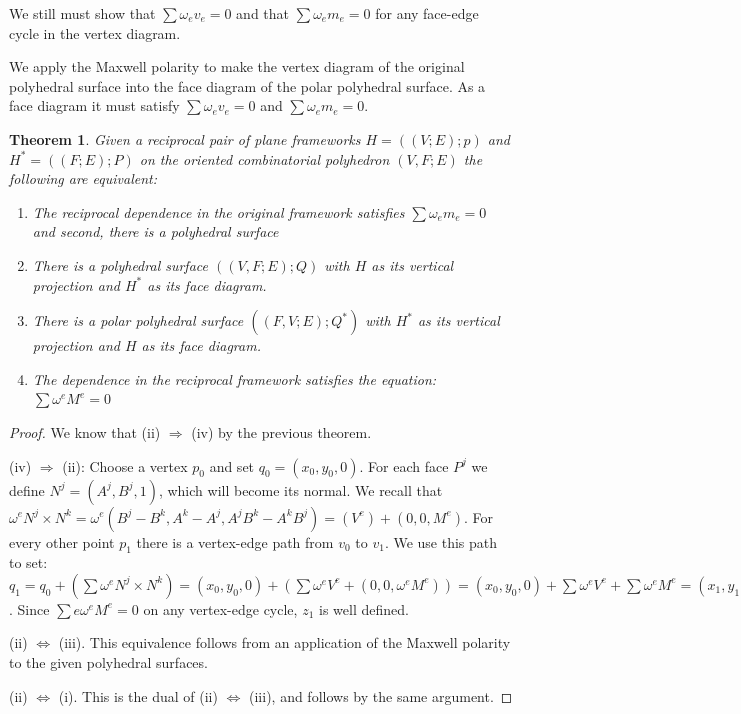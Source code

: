 \documentclass[11pt]{article}
\newtheorem{theorem}{Theorem}[section]
\theoremstyle{definition}
\begin{document}
 	We still must show that $\sum \omega_e v_e = 0$ and that $\sum \omega_em_e = 0$ for any face-edge cycle in the vertex diagram. 

	We apply the Maxwell polarity to make the vertex diagram of the original polyhedral surface into the face diagram of the polar polyhedral surface. 
	As a face diagram it must satisfy $\sum \omega_e v_e = 0$ and $\sum \omega_em_e = 0$.

	\begin{theorem} 
		Given a reciprocal pair of plane frameworks $H=((V;E);p)$ and $H^* = ((F;E);P)$ on the oriented combinatorial polyhedron $(V,F;E)$ the following are equivalent: 
 		\begin{enumerate} 
 			\item The reciprocal dependence in the original framework satisfies $\sum \omega_em_e = 0$ and second, there is a polyhedral surface 
 			\item There is a polyhedral surface $((V,F;E);Q)$ with $H$ as its vertical projection and $H^*$ as its face diagram.
			\item There is a polar polyhedral surface $((F,V;E);Q^*)$ with $H^*$ as its vertical projection and $H$ as its face diagram.
			\item The dependence in the reciprocal framework satisfies the equation: $\sum \omega^eM^e = 0$
		\end{enumerate}
	\end{theorem}
	
	\begin{proof}
		We know that (ii) $\Rightarrow$ (iv) by the previous theorem. 

		(iv) $\Rightarrow$ (ii): 
		Choose a vertex $p_0$ and set $q_0 = (x_0, y_0,0)$. 
		For each face $P^j$ we define $N^j = (A^j,B^j,1)$, which will become its normal. 
		We recall that $\omega^eN^j \times N^k = \omega^e(B^j-B^k,A^k-A^j, A^jB^k-A^kB^j) = (V^e) + (0,0,M^e)$. 
		For every other point $p_1$ there is a vertex-edge path from $v_0$ to $v_1$. 
		We use this path to set: 
		$q_1 = q_0 + (\sum \omega^eN^j \times N^k) = (x_0,y_0,0) + (\sum \omega^eV^e + (0,0,\omega^eM^e)) = (x_0,y_0,0) + \sum \omega^eV^e + \sum \omega^eM^e = (x_1,y_1,0) + (0,0,\sum \omega_eM^e)$. 
		Since $\sum{e}\omega^eM^e = 0$ on any vertex-edge cycle, $z_1$ is well defined.

		(ii) $\Leftrightarrow$ (iii). 
		This equivalence follows from an application of the Maxwell polarity to the given polyhedral surfaces.

		(ii) $\Leftrightarrow$ (i). 
		This is the dual of (ii) $\Leftrightarrow$ (iii), and follows by the same argument. 
	\end{proof}
 
\end{document}
